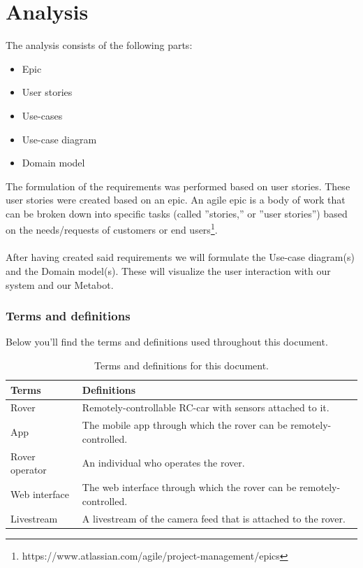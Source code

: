 \documentclass[12pt]{article}
\begin{document}
	\section{Analysis}
	The analysis consists of the following parts:
	\begin{itemize}
		\item Epic
		\item User stories
		\item Use-cases
		\item Use-case diagram
		\item Domain model\\
	\end{itemize}	
	The formulation of the requirements was performed based on user stories. These user stories were created based on an epic. An agile epic is a body of work that can be broken down into specific tasks (called ''stories,'' or ''user stories'') based on the needs/requests of customers or end users\footnote{https://www.atlassian.com/agile/project-management/epics}.\\
	\\After having created said requirements we will formulate the Use-case diagram(s) and the Domain model(s). These will visualize the user interaction with our system and our Metabot.
	\subsubsection{Terms and definitions}
	Below you'll find the terms and definitions used throughout this document.
	\begin{table}[H]
		\centering
		\begin{tabularx}{\linewidth}{|X|X|}
			\hline
			\textbf{Terms} &\textbf{Definitions}\\
			\hline
			Rover &Remotely-controllable RC-car with sensors attached to it.\\
			\hline
			App &The mobile app through which the rover can be remotely-controlled.\\
			\hline
			Rover operator &An individual who operates the rover.\\
			\hline
			Web interface &The web interface through which the rover can be remotely-controlled. \\
			\hline 
			Livestream &A livestream of the camera feed that is attached to the rover.\\
			\hline
		\end{tabularx}
		\caption{Terms and definitions for this document.}
		\label{table:termsDefinition}   
	\end{table}
	\newpage
\end{document}

